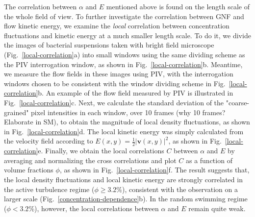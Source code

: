 \documentclass[twocolumn,aps,prl,amsmath,amssymb,longbibliography]{revtex4-2}
\begin{document}
The correlation between $\alpha$ and $E$ mentioned above is found on the length scale of the whole field of view.
To further investigate the correlation between GNF and flow kinetic energy, we examine the \emph{local} correlation between concentration fluctuations and kinetic energy at a much smaller length scale.
To do it, we divide the images of bacterial suspensions taken with bright field microscope (Fig.~\ref{local-correlation}a) into small windows using the same dividing scheme as the PIV interrogation window, as shown in Fig.~\ref{local-correlation}b.
Meantime, we measure the flow fields in these images using PIV, with the interrogation windows chosen to be consistent with the window dividing scheme in Fig.~\ref{local-correlation}b.
An example of the flow field measured by PIV is illustrated in Fig.~\ref{local-correlation}c.
Next, we calculate the standard deviation of the "coarse-grained" pixel intensities in each window, over 10 frames (why 10 frames? Elaborate in SM), to obtain the magnitude of local density fluctuations, as shown in Fig.~\ref{local-correlation}d.
The local kinetic energy was simply calculated from the velocity field according to $E(x, y) = \frac{1}{2}|\boldsymbol{v}(x, y)|^2$, as shown in Fig.~\ref{local-correlation}e.
Finally, we obtain the local correlations $C$ between $\alpha$ and $E$ by averaging and normalizing the cross correlations and plot $C$ as a function of volume fractions $\phi$, as shown in Fig.~\ref{local-correlation}f. The result suggests that, the local density fluctuations and local kinetic energy are strongly correlated in the active turbulence regime ($\phi\ge3.2\%$), consistent with the observation on a larger scale (Fig.~\ref{concentration-dependence}b).
In the random swimming regime ($\phi<3.2\%$), however, the local correlations between $\alpha$ and $E$ remain quite weak.
\end{document}
